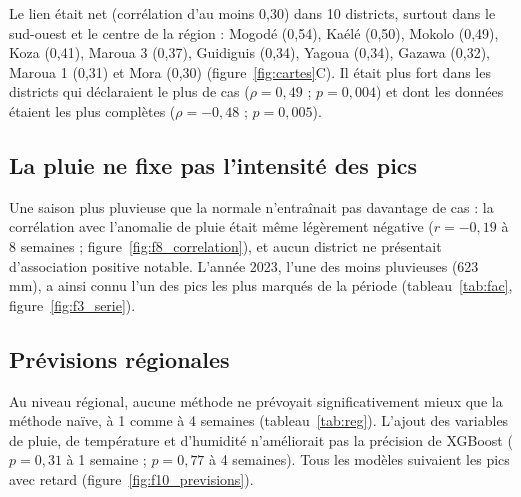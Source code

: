 \documentclass[11pt]{article}
\begin{document}
Le lien était net (corrélation d'au moins 0,30) dans 10 districts, surtout dans le sud-ouest et le centre de la région : Mogodé (0,54), Kaélé (0,50), Mokolo (0,49), Koza (0,41), Maroua 3 (0,37), Guidiguis (0,34), Yagoua (0,34), Gazawa (0,32), Maroua 1 (0,31) et Mora (0,30) (figure~\ref{fig:cartes}C). Il était plus fort dans les districts qui déclaraient le plus de cas ($\rho=0{,}49$ ; $p=0{,}004$) et dont les données étaient les plus complètes ($\rho=-0{,}48$ ; $p=0{,}005$).

\subsection{La pluie ne fixe pas l'intensité des pics}
Une saison plus pluvieuse que la normale n'entraînait pas davantage de cas : la corrélation avec l'anomalie de pluie était même légèrement négative ($r=-0{,}19$ à 8 semaines ; figure~\ref{fig:f8_correlation}), et aucun district ne présentait d'association positive notable. L'année 2023, l'une des moins pluvieuses (623 mm), a ainsi connu l'un des pics les plus marqués de la période (tableau~\ref{tab:fac}, figure~\ref{fig:f3_serie}).

\subsection{Prévisions régionales}
Au niveau régional, aucune méthode ne prévoyait significativement mieux que la méthode naïve, à 1 comme à 4 semaines (tableau~\ref{tab:reg}). L'ajout des variables de pluie, de température et d'humidité n'améliorait pas la précision de XGBoost ($p=0{,}31$ à 1 semaine ; $p=0{,}77$ à 4 semaines). Tous les modèles suivaient les pics avec retard (figure~\ref{fig:f10_previsions}).
\end{document}

